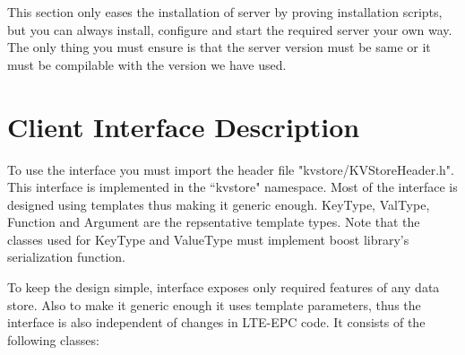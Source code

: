 \documentclass[11pt]{article}
\begin{document}
This section only eases the installation of server by proving installation scripts, but you can always install, configure and start the required server your own way. The only thing you must ensure is that the server version must be same or it must be compilable with the version we have used.



\section{Client Interface Description}
To use the interface you must import the header file "kvstore/KVStoreHeader.h". This interface is implemented in the ``kvstore" namespace. Most of the interface is designed using templates thus making it generic enough. KeyType, ValType, Function and Argument are the repsentative template types. Note that the classes used for KeyType and ValueType must implement boost library's serialization function.


To keep the design simple, interface exposes only required features of any data store. Also to make it generic enough it uses template parameters, thus the interface is also independent of changes in LTE-EPC code. It consists of the following classes:
\end{document}
